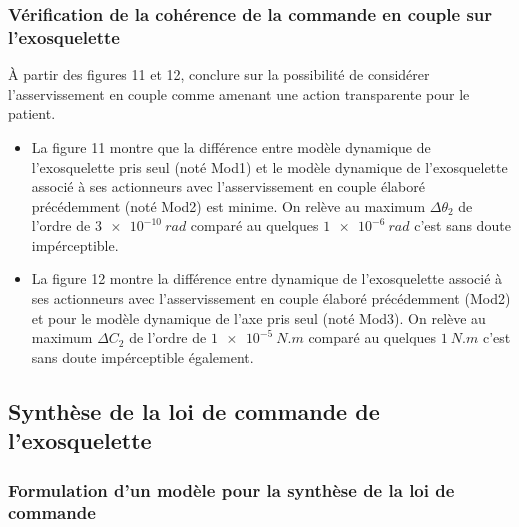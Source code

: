 \documentclass[11pt]{article}
\begin{document}
\subsubsection{Vérification de la cohérence de la commande en couple sur l’exosquelette}

\UPSTIquestion À partir des figures 11 et 12, conclure sur la possibilité de considérer l'asservissement en couple comme amenant une action transparente pour le patient.
\begin{UPSTIcorrige}


\begin{itemize}
\item La figure 11 montre que la différence entre modèle dynamique de l’exosquelette pris seul (noté Mod1) et le modèle dynamique de l’exosquelette associé à
ses actionneurs avec l’asservissement en couple élaboré précédemment (noté Mod2) est minime. On relève au maximum $\Delta \theta_2$ de l'ordre de $\SI{3e-10}{rad}$ comparé au quelques $\SI{1e-6}{rad}$ c'est sans doute impérceptible.
\item La figure 12 montre la différence entre dynamique de l’exosquelette associé à ses actionneurs avec l’asservissement en couple élaboré précédemment
(Mod2) et pour le modèle dynamique de l’axe pris seul (noté Mod3). On relève au maximum $\Delta C_2$ de l'ordre de $\SI{1e-5}{N.m}$ comparé au quelques $\SI{1}{N.m}$ c'est sans doute impérceptible également.
\end{itemize}
 

\end{UPSTIcorrige}

\subsection{Synthèse de la loi de commande de l'exosquelette}
\subsubsection{Formulation d’un modèle pour la synthèse de la loi de commande}
\begin{UPSTIcorrige}

\end{UPSTIcorrige}
\end{document}
